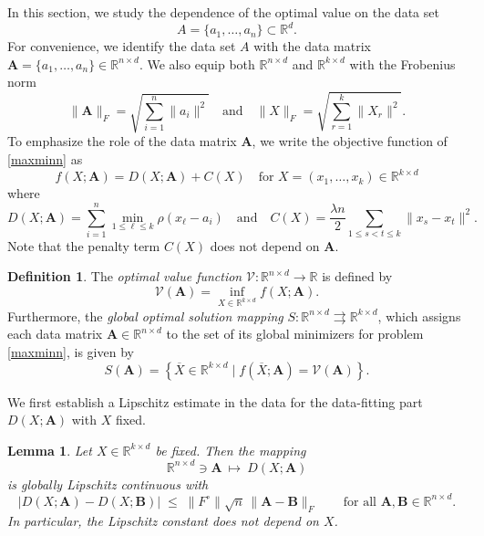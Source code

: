 \documentclass[11pt]{article}
\newtheorem{lemma}[theorem]{Lemma}
\theoremstyle{definition}
\newtheorem{definition}[theorem]{Definition}
\newcommand{\R}{\mathbb{R}}
\newcommand{\1}{\mathbf{1}}
\def\Bar{\overline}
\begin{document}
In this section, we study the dependence of the optimal value on the data set
\[
A = \{a_1,\dots,a_n\}\subset\R^d.
\]
For convenience, we identify the data set $A$ with the data matrix $\mathbf{A} = \{a_1, \dots, a_n\}\in\R^{n\times d}$. We also equip both $\R^{n\times d}$ and
$\R^{k\times d}$ with the Frobenius norm
\[
\|\mathbf{A}\|_F = \sqrt{\sum_{i=1}^n \|a_i\|^2}
\quad\text{and}\quad
\|X\|_F = \sqrt{\sum_{r=1}^k \|X_r\|^2}.
\]
To emphasize the role of the data matrix $\mathbf{A}$, we write the objective function of \eqref{maxminn} as
\[
f(X;\mathbf{A})  
=
D(X;\mathbf{A})+C(X)\quad\text{for }X=(x_1,\dots,x_k)\in\R^{k\times d}
\]
where
\[
D(X;\mathbf{A})
=
\sum_{i=1}^n \min_{1\le \ell \le k}\rho(x_\ell-a_i)
\quad\text{and}\quad
C(X)
=
\frac{\lambda n}{2}\sum_{1\le s<t\le k}\|x_s-x_t\|^2.
\]
Note that the penalty term $C(X)$ does not depend on $\mathbf{A}$. 

\begin{definition}
The \textit{optimal value function} $\mathcal{V} \colon \mathbb{R}^{n \times d} \to \mathbb{R}$ is defined by
\begin{equation}\label{valueoptimalfunction}
\mathcal{V}(\mathbf{A}) = \inf_{X \in \mathbb{R}^{k \times d}} f(X; \mathbf{A}).
\end{equation}
Furthermore, the \textit{global optimal solution mapping}  $S \colon \mathbb{R}^{n \times d} \rightrightarrows \mathbb{R}^{k \times d}$, which assigns each data matrix $\mathbf{A}\in \mathbb{R}^{n \times d}$ to the set of its global minimizers for problem \eqref{maxminn}, is given by
\begin{equation}\label{solutionmapping}
S(\mathbf{A}) = \left\{ \Bar{X} \in \mathbb{R}^{k \times d} \mid f(\Bar{X}; \mathbf{A}) = \mathcal{V}(\mathbf{A}) \right\}.
\end{equation}
\end{definition}



We first establish a Lipschitz estimate in the data for the data-fitting part
$D(X;\mathbf{A})$ with $X$ fixed.

\begin{lemma}\label{lem:Lip-D}
Let $X\in\R^{k\times d}$ be fixed. Then the mapping
\[
\R^{n\times d}\ni \mathbf{A}\ \longmapsto\ D(X;\mathbf{A})
\]
is globally Lipschitz continuous with
\[
|D(X;\mathbf{A})-D(X;\mathbf{B})|
\;\le\;
\|F^\circ\|\sqrt{n}\,\|\mathbf{A}-\mathbf{B}\|_F
\qquad
\text{for all }\mathbf{A},\mathbf{B}\in\R^{n\times d}.
\]
In particular, the Lipschitz constant does not depend on $X$.
\end{lemma}
\end{document}
